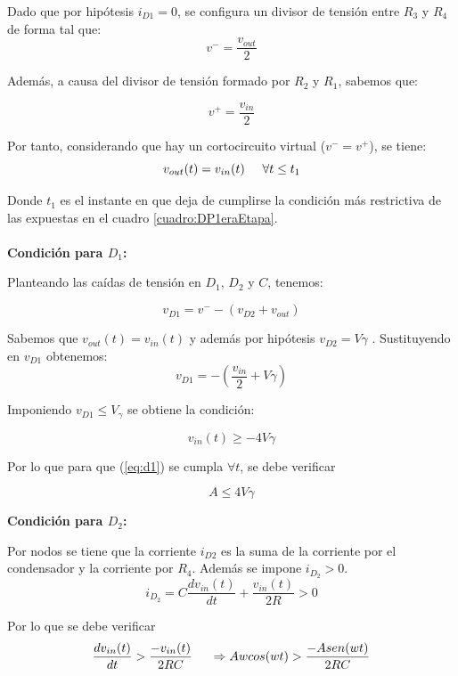 Dado que por hipótesis $i_{D1}=0$, se configura un divisor de tensión entre $R_3$ y $R_4$ de forma tal que:
	$$ v^-=\frac{v_{out}}{2}$$

Además, a causa del divisor de tensión formado por $R_2$ y $R_1$, sabemos que:

$$v^+ = \frac{v_{in}}{2}$$

Por tanto, considerando que hay un cortocircuito virtual ($v^-=v^+$), se tiene:
\begin{equation}
v_{out}(t)= v_{in}(t) \hspace{0.5cm} \forall t\leq t_1
\label{eq:v_{out}}
\end{equation}

Donde $t_1$ es el instante en que deja de cumplirse la condición más restrictiva de las expuestas en el cuadro \ref{cuadro:DP1eraEtapa}.\\\\
{\large \bf Condición para $D_1$:}

Planteando las caídas de tensión en $D_1$, $D_2$ y $C$, tenemos:

$$v_{D1}= v ^- - (v_{D2}+ v_{out})$$

Sabemos que $v_{out}(t)=v_{in}(t)$ y además por hipótesis $v_{D2}=V\gamma$ . Sustituyendo en $v_{D1}$ obtenemos:
$$v_{D1}=-\left(\frac{v_{in}}{2} +V\gamma \right)$$

Imponiendo $v_{D1} \leq V_\gamma $ se obtiene la condición:

\begin{equation}
 v_{in}(t) \geq -4V\gamma 
 \label{eq:d1}
\end{equation}

Por lo que para que (\ref{eq:d1}) se cumpla $\forall t$, se debe verificar

\begin{equation*}
 A \leq 4V\gamma 
\end{equation*}

{\large \bf Condición para $D_2$:}

Por nodos se tiene que la corriente $i_{D2}$ es la suma de la corriente por el condensador y la corriente por  $R_{4}$. 
Además se impone $i_{D_{2}}>0$.
\begin{equation*}
      i_{D_{2}} = C \frac{dv_{in}(t)}{dt} + \frac{v_{in}(t)}{2R}  > 0
\end{equation*}

Por lo que se debe verificar
\begin{equation*}
\frac{dv_{in}(t)}{dt} > \frac{-v_{in}(t)}{2RC} \hspace{0.5cm} \Rightarrow Awcos(wt) > \frac{-Asen(wt)}{2RC}
\end{equation*}

